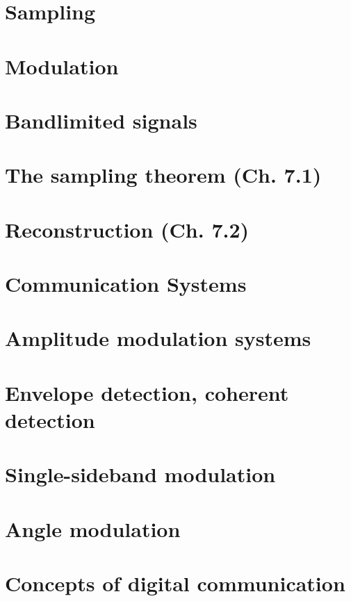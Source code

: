 \documentclass{article}
\begin{document}
\section*{Sampling}
\section{Modulation}

\newpage
\section{Bandlimited signals}
\newpage

\section{The sampling theorem (Ch. 7.1)}
\newpage

\section{Reconstruction (Ch. 7.2)}
\newpage

\section*{Communication Systems}
\section{Amplitude modulation systems}
\newpage

\section{Envelope detection, coherent detection}
\newpage

\section{Single-sideband modulation}
\newpage

\section{Angle modulation}
\newpage

\section{Concepts of digital communication}
\end{document}
